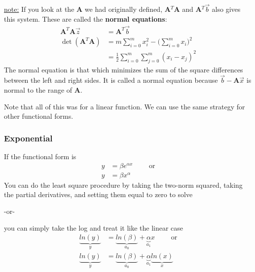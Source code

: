 \documentclass[12pt]{article}
\newcommand{\ve}[1]{\ensuremath{\mathbf{#1}}}
\begin{document}
\underline{note:} If you look at the \ve{A} we had originally defined, \ve{A}$^T$\ve{A} and \ve{A}$^T\vec{b}$ also gives this system. These are called the \textbf{normal equations}:
%
\begin{align}
\ve{A}^T\ve{A} \vec{z} &= \ve{A}^T\vec{b} \nonumber\\
%
\det(\ve{A}^T\ve{A}) &= m \sum_{i=0}^m x_i^2 -  \bigl(\sum_{i=0}^m x_i\bigr)^2 \nonumber\\
%
&= \frac{1}{2} \sum_{i=0}^m \sum_{j=0}^m (x_i - x_j)^2\nonumber
\end{align}
%
The normal equation is that which minimizes the sum of the square differences between the left and right sides. It is called a normal equation because $\vec{b}-\ve{A}\vec{x}$ is normal to the range of $\ve{A}$. %

Note that all of this was for a linear function. We can use the same strategy for other functional forms.

\subsubsection*{Exponential}
If the functional form is
%
\begin{align}
y &= \beta e^{\alpha x} \qquad\text{ or}\nonumber\\
y &= \beta x^{\alpha}\nonumber
\end{align}
%
You can do the least square procedure by taking the two-norm squared, taking the partial derivatives, and setting them equal to zero to solve

-or- 

you can simply take the log and treat it like the linear case
%
\begin{align}
\underbrace{ln(y)}_{y} &= \underbrace{ln(\beta)}_{a_0} + \underbrace{\alpha}_{a_1} x \qquad \text{ or}\nonumber\\
\underbrace{ln(y)}_{y} &= \underbrace{ln(\beta)}_{a_0} + \underbrace{\alpha}_{a_1} \underbrace{ln(x)}_{x}\nonumber
\end{align}


\end{document}
